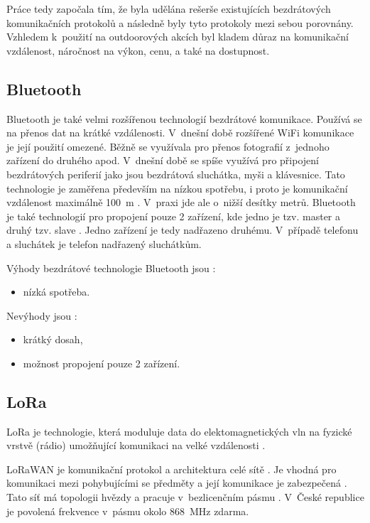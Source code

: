 Práce tedy započala tím, že byla udělána rešerše existujících bezdrátových komunikačních protokolů a následně byly tyto protokoly 
mezi sebou porovnány. Vzhledem k~použití na outdoorových akcích byl kladem důraz na komunikační vzdálenost, náročnost na výkon, cenu, 
a také na dostupnost. 

\subsection{Bluetooth}
Bluetooth je také velmi rozšířenou technologií bezdrátové komunikace. Používá se na přenos dat na krátké vzdálenosti. V~dnešní době 
rozšířené WiFi komunikace je její použití omezené. Běžně se využívala pro přenos fotografií z~jednoho zařízení do druhého apod. V~dnešní 
době se spíše využívá pro připojení bezdrátových periferií jako jsou bezdrátová sluchátka, myši a klávesnice. Tato technologie je zaměřena 
především na nízkou spotřebu, i proto je komunikační vzdálenost maximálně 100~m \cite{Bezdrat_muni}. V~praxi jde ale o~nižší desítky
metrů. Bluetooth je také technologií pro propojení pouze 2 zařízení, kde jedno je tzv. master a druhý tzv. slave \cite{Bezdrat_muni}. 
Jedno zařízení je tedy nadřazeno druhému. V~případě telefonu a sluchátek je telefon nadřazený sluchátkům. 

Výhody bezdrátové technologie Bluetooth jsou \cite{Bezdrat_muni}:
\begin{itemize}
  \item nízká spotřeba.
\end{itemize}

Nevýhody jsou \cite{Bezdrat_muni}:
\begin{itemize}
  \item krátký dosah,
  \item možnost propojení pouze 2 zařízení.
\end{itemize}

\subsection{LoRa}
LoRa je technologie, která moduluje data do elektomagnetických vln na fyzické vrstvě (rádio) umožňující komunikaci na velké vzdálenosti \cite{LoRa_eman}. 

LoRaWAN je komunikační protokol a architektura celé sítě \cite{LoRa_eman}. Je vhodná pro komunikaci mezi pohybujícími se předměty a její komunikace je 
zabezpečená \cite{LoRa_eman}. Tato síť má topologii hvězdy a pracuje v~bezlicenčním pásmu \cite{LoRa_eman}. V~České republice je povolená frekvence v~pásmu 
okolo 868~MHz zdarma.

